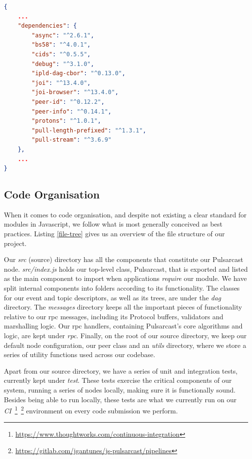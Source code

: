 \begin{lstlisting}[language=JSON, float, caption={Pulsarcast module dependency list},label={dependencies}]
{
	...
	"dependencies": {
		"async": "^2.6.1",
		"bs58": "^4.0.1",
		"cids": "^0.5.5",
		"debug": "^3.1.0",
		"ipld-dag-cbor": "^0.13.0",
		"joi": "^13.4.0",
		"joi-browser": "^13.4.0",
		"peer-id": "^0.12.2",
		"peer-info": "^0.14.1",
		"protons": "^1.0.1",
		"pull-length-prefixed": "^1.3.1",
		"pull-stream": "^3.6.9"
	},
	...
}
\end{lstlisting}

\subsection{Code Organisation}\label{subsec:code-organisation}

When it comes to code organisation, and despite not existing a clear standard
for modules in Javascript, we follow what is most generally conceived as best
practices. Listing \ref{file-tree} gives us an overview of the file structure
of our project. 

Our \emph{src} (source) directory has all the components that constitute our
Pulsarcast node. \emph{src/index.js} holds our top-level class, Pulsarcast,
that is exported and listed as the main component to import when applications
\emph{require} our module. We have split internal components into folders
according to its functionality. The classes for our event and topic
descriptors, as well as its trees, are under the \emph{dag} directory. The
\emph{messages} directory keeps all the important pieces of functionality
relative to our \acrshort{rpc} messages, including its Protocol buffers,
validators and marshalling logic. Our \acrshort{rpc} handlers, containing
Pulsarcast's core algorithms and logic, are kept under \emph{rpc}. Finally, on
the root of our source directory, we keep our default node configuration, our
peer class and an \emph{utils} directory, where we store a series of utility
functions used across our codebase.

Apart from our source directory, we have a series of unit and integration
tests, currently kept under \emph{test}. These tests exercise the critical
components of our system, running a series of nodes locally, making sure it is
functionally sound. Besides being able to run locally, these tests are what we
currently run on our
\emph{CI}~\footnote{\url{https://www.thoughtworks.com/continuous-integration}}~\footnote{\url{https://gitlab.com/jgantunes/js-pulsarcast/pipelines}}
environment on every code submission we perform.

